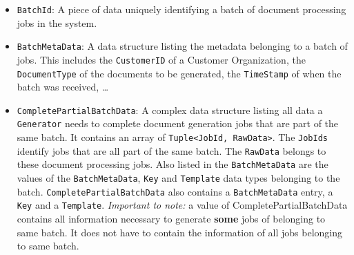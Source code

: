 \documentclass[a4paper,10pt]{article}
\begin{document}
\begin{itemize}
	\item \texttt{BatchId}: A piece of data uniquely identifying a batch of document processing jobs in the system.
	\item \texttt{BatchMetaData}: A data structure listing the metadata belonging to a batch of jobs. This includes the \texttt{CustomerID} of a Customer Organization, the \texttt{DocumentType} of the documents to be generated, the \texttt{TimeStamp} of when the batch was received, \dots
	\item \texttt{CompletePartialBatchData}: A complex data structure listing all data a \texttt{Generator} needs to complete document generation jobs that are part of the same batch. It contains an array of \texttt{Tuple<JobId, RawData>}. The \texttt{JobIds} identify jobs that are all part of the same batch. The \texttt{RawData} belongs to these document processing jobs. Also listed in the \texttt{BatchMetaData} are the values of the \texttt{BatchMetaData}, \texttt{Key} and \texttt{Template} data types belonging to the batch.	
	 \texttt{CompletePartialBatchData} also contains a \texttt{BatchMetaData} entry, a \texttt{Key} and a \texttt{Template}. \emph{Important to note:} a value of CompletePartialBatchData contains all information necessary to generate \textbf{some} jobs of belonging to same batch. It does not have to contain the information of all jobs belonging to same batch.
	 

\end{itemize}
\end{document}
